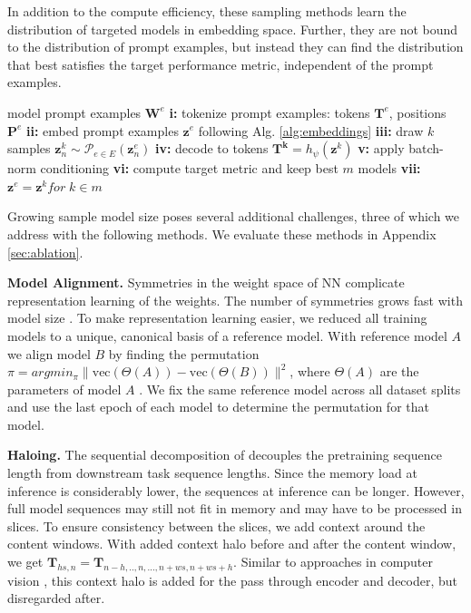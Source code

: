 In addition to the compute efficiency, these sampling methods learn the distribution of targeted models in embedding space. 
Further, they are not bound to the distribution of prompt examples, but instead they can find the distribution that best satisfies the target performance metric, independent of the prompt examples.
\begin{algorithm}[]
   \caption{Sampling models with \ourmethod }
   \label{alg:generating}
\begin{algorithmic}
     model prompt examples $\mathbf{W}^e$
    \STATE \textbf{i:} tokenize prompt examples: tokens $\mathbf{T}^e$, positions $\mathbf{P}^e$
    \STATE \textbf{ii:} embed prompt examples $\mathbf{z}^e$ following Alg. \ref{alg:embeddings}
        \STATE \textbf{iii:} draw $k$ samples $\mathbf{z}_n^k \sim \mathcal{P}_{e \in E}(\mathbf{z}_n^e)$
        \STATE \textbf{iv:} decode to tokens $\mathbf{T^k} = h_{\psi}( \mathbf{z}^k )$
        \STATE \textbf{v:} apply batch-norm conditioning
        \STATE \textbf{vi:} compute target metric and keep best $m$ models
            \STATE \textbf{vii:} $\mathbf{z}^e = \mathbf{z}^k for \; k \in m$ 
        \ENDIF
    \ENDFOR
\end{algorithmic}
\end{algorithm}
\vspace{-8pt}
% 
 
Growing sample model size poses several additional challenges, three of which we address with the following methods. We evaluate these methods in Appendix \ref{sec:ablation}.

\textbf{Model Alignment.}
Symmetries in the weight space of NN complicate representation learning of the weights. The number of symmetries grows fast with model size \citep{bishopPatternRecognitionMachine2006}. 
To make representation learning easier, we reduced all training models to a unique, canonical basis of a reference model.
With reference model $A$ we align model $B$ by finding the permutation $\pi = argmin_{\pi} \|\text{vec}(\Theta{(A)}) - \text{vec}(\Theta(B))\|^2$, where $\Theta(A)$ are the parameters of model $A$ \citep{ainsworthGitReBasinMerging2022}. 
We fix the same reference model across all dataset splits and use the last epoch of each model to determine the permutation for that model.

\textbf{Haloing.}
The sequential decomposition of \ourmethod decouples the pretraining sequence length from downstream task sequence lengths.
Since the memory load at inference is considerably lower, the sequences at inference can be longer. 
However, full model sequences may still not fit in memory and may have to be processed in slices.
To ensure consistency between the slices, we add context around the content windows. With added context halo before and after the content window, we get
$\mathbf{T}_{hs,n}=\mathbf{T}_{n-h,..,n,...,n+ws,n+ws+h}$. 
Similar to approaches in computer vision \citep{vaswaniScalingLocalSelfAttention2021}, this context halo is added for the pass through encoder and decoder, but disregarded after.

